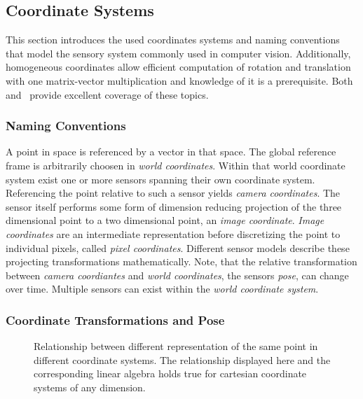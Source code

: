 \subsection{Coordinate Systems}

This section introduces the used coordinates systems and naming conventions that model the sensory system commonly used in computer vision.
Additionally, homogeneous coordinates allow efficient computation of rotation and translation with one matrix-vector multiplication and knowledge of it is a prerequisite.
Both~\cite{hartley_2004} and~\cite{corke_2011} provide excellent coverage of these topics.

\subsubsection*{Naming Conventions}

A point in space is referenced by a vector in that space.
The global reference frame is arbitrarily choosen in \emph{world coordinates}.
Within that world coordinate system exist one or more sensors spanning their own coordinate system.
Referencing the point relative to such a sensor yields \emph{camera coordinates}.
The sensor itself performs some form of dimension reducing projection of the three dimensional point to a two dimensional point, an \emph{image coordinate}.
\emph{Image coordinates} are an intermediate representation before discretizing the point to individual pixels, called \emph{pixel coordinates}.
Different sensor models describe these projecting transformations mathematically.
Note, that the relative transformation between \emph{camera coordiantes} and \emph{world coordinates}, the sensors \emph{pose}, can change over time.
Multiple sensors can exist within the \emph{world coordinate system}.

\subsubsection*{Coordinate Transformations and Pose}

\begin{figure}[H]
    
    \caption[Coordinate Transformation]{Relationship between different representation of the same point in different coordinate systems. The relationship displayed here and the corresponding linear algebra holds true for cartesian coordinate systems of any dimension.}
\end{figure}


